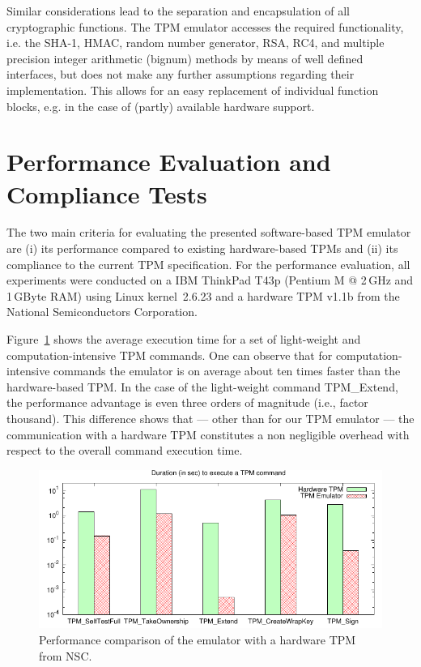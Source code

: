 \documentclass[runningheads]{llncs}
\begin{document}
Similar considerations lead to the separation and encapsulation of all
cryptographic functions. The TPM emulator accesses the required functionality,
i.e. the SHA-1, HMAC, random number generator, RSA, RC4, and multiple
precision integer arithmetic (bignum) methods by means of well defined
interfaces, but does not make any further assumptions regarding their
implementation. This allows for an easy replacement of individual function
blocks, e.g. in the case of (partly) available hardware support.


\section{Performance Evaluation and Compliance Tests}\label{sec:state}
The two main criteria for evaluating the presented software-based TPM
emulator are (i) its performance compared to existing hardware-based TPMs and
(ii) its compliance to the current TPM specification. For the performance
evaluation, all experiments were conducted on a IBM ThinkPad T43p (Pentium M @
2\,GHz and 1\,GByte RAM) using Linux kernel~2.6.23 and a hardware TPM v1.1b
from the National Semiconductors Corporation.

Figure~\ref{plot:performance} shows the average execution time for a set of
light-weight and computation-intensive TPM commands. One can observe that for
computation-intensive commands the emulator is on average about ten times
faster than the hardware-based TPM. In the case of the light-weight command
\textsf{TPM\_Extend}, the performance advantage is even three orders of
magnitude (i.e., factor thousand). This difference shows that --- other than
for our TPM emulator --- the communication with a hardware TPM constitutes a
non negligible overhead with respect to the overall command execution time.

\begin{figure}
    \centering
    \includegraphics[width=.8\textwidth]{plots/performance_comparison}
    \vspace*{-2mm}
    \caption{Performance comparison of the emulator with a hardware
             TPM from NSC.}
    \label{plot:performance}\vspace*{-5mm}
\end{figure}
\end{document}
